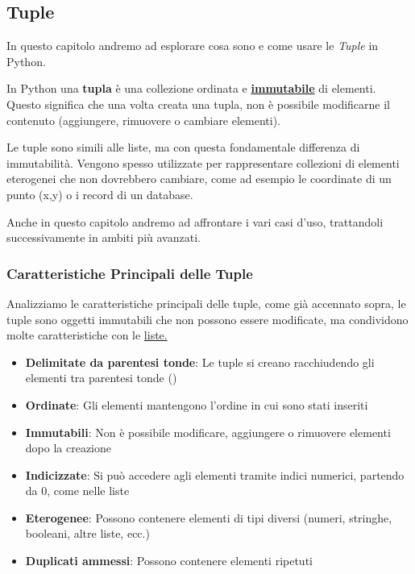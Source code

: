 \subsection{Tuple}\label{Tuple}

In questo capitolo andremo ad esplorare cosa sono e come usare le \textit{Tuple} in Python.

\vspace{0,5cm}


In Python una \textbf{tupla} è una collezione ordinata e \hyperref[mutableImmutable]{\textbf{immutabile}} di elementi. Questo significa che una volta creata una tupla, non è possibile modificarne il contenuto (aggiungere, rimuovere o cambiare elementi). 

Le tuple sono simili alle liste, ma con questa fondamentale differenza di immutabilità. Vengono spesso utilizzate per rappresentare collezioni di elementi eterogenei che non dovrebbero cambiare, come ad esempio le coordinate di un punto (x,y) o i record di un database.

Anche in questo capitolo andremo ad affrontare i vari casi d'uso, trattandoli successivamente in ambiti più avanzati.

\subsubsection{Caratteristiche Principali delle Tuple}\label{CaratteristicheTuple}

Analizziamo le caratteristiche principali delle tuple, come già accennato sopra, le tuple sono oggetti immutabili che non possono essere modificate, ma condividono molte caratteristiche con le  \hyperref[ListeCap1]{liste.}

\begin{tcolorbox}[colback=blue!5!white,colframe=blue!75!black,title=Caratteristiche principali delle Tuple]
\begin{itemize}
    \item \textbf{Delimitate da parentesi tonde}: Le tuple si creano racchiudendo gli elementi tra parentesi tonde ()
    \item \textbf{Ordinate}: Gli elementi mantengono l'ordine in cui sono stati inseriti
    \item \textbf{Immutabili}: Non è possibile modificare, aggiungere o rimuovere elementi dopo la creazione
    \item \textbf{Indicizzate}: Si può accedere agli elementi tramite indici numerici, partendo da 0, come nelle liste
    \item \textbf{Eterogenee}: Possono contenere elementi di tipi diversi (numeri, stringhe, booleani, altre liste, ecc.)
    \item \textbf{Duplicati ammessi}: Possono contenere elementi ripetuti
\end{itemize}
\end{tcolorbox}



